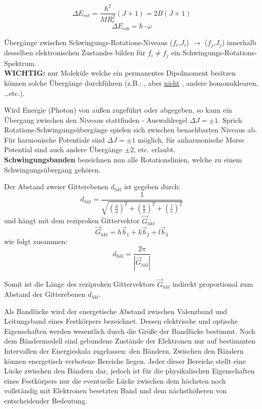 \[\Delta E_{rot} = \frac{\hbar^2}{M R_e^2}(J+1) = 2B(J+1)\]
\[\Delta E_{vib} = \hbar \cdot \omega\]

\label{q:3}

Übergänge zwischen Schwingungs-Rotations-Niveaus ($f_i$,$J_i$) $\rightarrow$ ($f_j$,$J_j$) innerhalb desselben elektronischen Zustandes bilden für $f_i \neq f_j$ ein Schwingungs-Rotations-Spektrum. \\

\textbf{WICHTIG:} nur Moleküle welche ein permanentes Dipolmoment besitzen können solche Übergänge durchführen (z.B.: ,  aber \underline{nicht} , andere homonuklearen, \dots etc.).

Wird Energie (Photon) von außen zugeführt oder abgegeben, so kann ein Übergang zwischen den Niveaus stattfinden - Auswahlregel $\Delta J = \pm 1$. Sprich Rotations-Schwingungsübergänge spielen sich zwischen benachbarten Niveaus ab. Für harmonische Potentiale sind $\Delta J = \pm 1$ möglich, für anharmonische Morse Potential sind auch andere Übergänge $\pm 2$, etc. erlaubt.\\

\textbf{Schwingungsbanden} bezeichnen nun alle Rotationslinien, welche zu einem Schwingungsübergang gehören.


\label{q:4}

Der Abstand zweier Gitterebenen $d_{hkl}$ ist gegeben durch:
\[d_{hkl} = \frac{1}{\sqrt{\left(\frac{h}{a}\right)^2 + \left(\frac{k}{b}\right)^2 + \left(\frac{l}{c}\right)^2}}\]
und hängt mit dem reziproken Gittervektor $\vec{G}_{hkl}$
\[\vec{G}_{hkl} = h\vec{b}_1 + k\vec{b}_2 + l\vec{b}_3\]
wie folgt zusammen:
\[d_{hkl} = \frac{2\pi}{|\vec{G}_{hkl}|}\]

Somit ist die Länge des reziproken Gittervektors $\vec{G}_{hkl}$ indirekt proportional zum Abstand der Gitterebenen $d_{hkl}$.

\label{q:5}

Als Bandlücke wird der energetische Abstand zwischen Valenzband und Leitungsband eines Festkörpers bezeichnet. Dessen elektrische und optische Eigenschaften werden wesentlich durch die Größe der Bandlücke bestimmt.
Nach dem Bändermodell sind gebundene Zustände der Elektronen nur auf bestimmten Intervallen der Energieskala zugelassen: den Bändern. Zwischen den Bändern können energetisch verbotene Bereiche liegen. Jeder dieser Bereiche stellt eine Lücke zwischen den Bändern dar, jedoch ist für die physikalischen Eigenschaften eines Festkörpers nur die eventuelle Lücke zwischen dem höchsten noch vollständig mit Elektronen besetzten Band und dem nächsthöheren von entscheidender Bedeutung.

